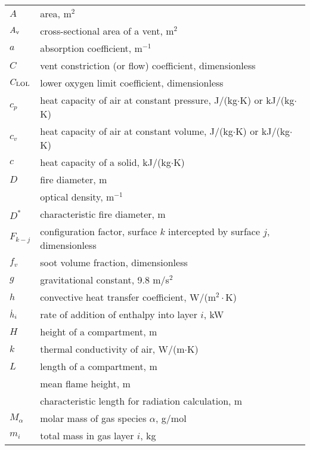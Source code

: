 \documentclass[12pt]{book}
\begin{document}
\begin{center}
\begin{longtable}{p{1in}  p{5.5 in}}

$A$                 & area, m$^2$ \\
$A_{\rm v}$         & cross-sectional area of a vent, m$^2$ \\
$a$                 & absorption coefficient, m$^{-1}$ \\
$C$                 & vent constriction (or flow) coefficient, dimensionless \\
$C_{\rm LOL}$       & lower oxygen limit coefficient, dimensionless \\
$c_p$               & heat capacity of air at constant pressure, J/(kg$\cdot$K) or kJ/(kg$\cdot$K) \\
$c_v$               & heat capacity of air at constant volume, J/(kg$\cdot$K) or kJ/(kg$\cdot$K) \\
$c$                 & heat capacity of a solid, kJ/(kg$\cdot$K) \\
$D$                 & fire diameter, m \\
                    & optical density, m$^{-1}$ \\
$D^*$               & characteristic fire diameter, m \\
$F_{k-j}$           & configuration factor, surface $k$ intercepted by surface $j$, dimensionless \\
$f_v$               & soot volume fraction, dimensionless \\
$g$                 & gravitational constant, 9.8 m/s$^2$ \\
$h$                 & convective heat transfer coefficient, W/(m$^2\cdot$K) \\
$\dot{h}_i$            & rate of addition of enthalpy into layer $i$, kW \\
$H$                 & height of a compartment, m \\
$k$                 & thermal conductivity of air, W/(m$\cdot$K) \\
$L$                 & length of a compartment, m \\
                    & mean flame height, m \\
                    & characteristic length for radiation calculation, m \\
$M_\alpha$          & molar mass of gas species $\alpha$, g/mol \\
$m_i$               & total mass in gas layer $i$, kg \\

\end{longtable}
\end{center}
\end{document}
